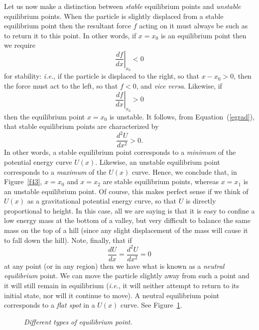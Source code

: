 Let us now make a distinction between {\em stable}\/ equilibrium points
and {\em unstable}\/ equilibrium points. When the particle is slightly
displaced from a stable equilibrium point then the resultant force $f$ acting
on it
must always be such as to  return it to this point.
In other words, if $x=x_0$ is an equilibrium point then we require
\begin{equation}
\left.\frac{df}{dx}\right|_{x_0} <0
\end{equation}
for stability: {\em i.e.}, if the particle is displaced to the right, so that $x-x_0>0$,
then the force must act to the left, so that $f <0$, and {\em vice versa}.
Likewise, if 
\begin{equation}
\left.\frac{df}{dx}\right|_{x_0} >0
\end{equation}
then the equilibrium point $x=x_0$ is unstable. It follows, from
 Equation~(\ref{egrad}), that stable equilibrium points are
characterized by
\begin{equation}
\frac{d^2 U}{dx^2}>0.
\end{equation}
In other words, a stable equilibrium point corresponds to a {\em minimum}\/
of the potential energy curve $U(x)$. Likewise, an unstable
equilibrium point corresponds to a {\em maximum}\/ of the $U(x)$ curve. Hence,
we conclude that,
in Figure~\ref{f43},  $x=x_0$ and $x=x_2$ are stable equilibrium points, whereas $x=x_1$ is an unstable equilibrium point. 
Of course, this makes perfect sense if we think of $U(x)$ as
a gravitational potential energy curve,  so that $U$ is
directly proportional to height. In this case, all we are saying is that it is
easy to confine a low energy mass at the bottom of a valley,
but very difficult to balance the same mass on the top of
a hill (since any slight displacement of the mass will cause it
to fall down the hill). Note, finally, that if
\begin{equation}
\frac{dU}{dx}=\frac{d^2 U}{dx^2}=0
\end{equation}
at any point (or in any region) then we have what is known as a {\em neutral equilibrium}\/
point. We can move the particle slightly away from such a point and it will still
remain in equilibrium ({\em i.e.}, it will neither attempt to return to
its initial state,  nor will it continue to move). A neutral equilibrium point
corresponds to a {\em flat spot}\/ in a $U(x)$ curve. See Figure~\ref{f44}.

\begin{figure}
\centerline{}
\caption{\em Different types of equilibrium point.}\label{f44}   
\end{figure}

